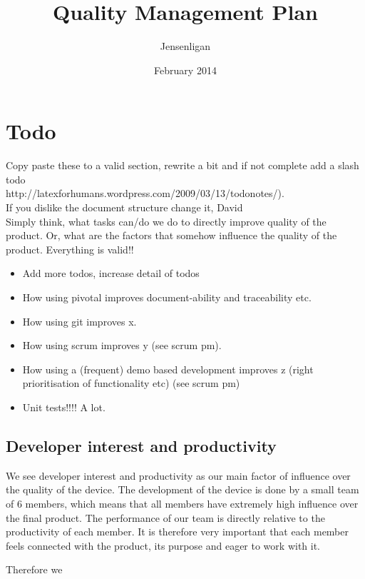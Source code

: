 \documentclass{article}
\title{Quality Management Plan}
\author{Jensenligan}
\date{February 2014}
\begin{document}
\maketitle

\section{Todo}


Copy paste these to a valid section, rewrite a bit and if not complete add a slash todo \\
http://latexforhumans.wordpress.com/2009/03/13/todonotes/).\\If you dislike the document structure change it, David
\\
Simply think, what tasks can/do we do to directly improve quality of the product. Or, what are the factors that somehow influence the quality of the product. Everything is valid!!
\begin{itemize}
\item Add more todos, increase detail of todos
\item How using pivotal improves document-ability and traceability etc.
\item How using git improves x.
\item How using scrum improves y (see scrum pm).
\item How using a (frequent) demo based development improves z (right prioritisation of functionality etc) (see scrum pm)
\item Unit tests!!!! A lot.
\end{itemize}


\subsection{Developer interest and productivity}
We see developer interest and productivity as our main factor of influence over the quality of the device. 
The development of the device is done by a small team of 6 members, which means that all members have extremely high influence over the final product.
The performance of our team is directly relative to the productivity of each member.
It is therefore very important that each member feels connected with the product, its purpose and eager to work with it. 

Therefore we 
\end{document}
